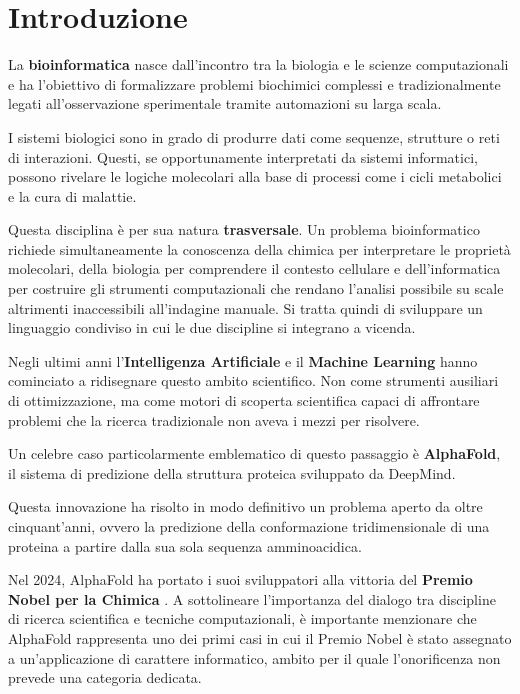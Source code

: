 \chapter{Introduzione}

La \textbf{bioinformatica} nasce dall'incontro tra la biologia e le scienze computazionali e ha l'obiettivo di formalizzare problemi biochimici complessi e tradizionalmente legati all'osservazione sperimentale tramite automazioni su larga scala.

I sistemi biologici sono in grado di produrre dati come sequenze, strutture o reti di interazioni.
Questi, se opportunamente interpretati da sistemi informatici, possono rivelare le logiche molecolari alla base di processi come i cicli metabolici e la cura di malattie.

Questa disciplina è per sua natura \textbf{trasversale}. 
Un problema bioinformatico richiede simultaneamente 
la conoscenza della chimica per interpretare le 
proprietà molecolari, della biologia per comprendere 
il contesto cellulare e dell'informatica per 
costruire gli strumenti computazionali che rendano l'analisi possibile su scale altrimenti inaccessibili 
all'indagine manuale. Si tratta quindi di sviluppare un linguaggio 
condiviso in cui le due discipline si integrano 
a vicenda.

Negli ultimi anni l'\textbf{Intelligenza Artificiale} e il 
\textbf{Machine Learning} hanno cominciato a ridisegnare
questo ambito scientifico. Non come strumenti ausiliari di 
ottimizzazione, ma come motori di scoperta scientifica 
capaci di affrontare problemi che la ricerca tradizionale 
non aveva i mezzi per risolvere.

Un celebre caso particolarmente emblematico
di questo passaggio è \textbf{AlphaFold}, il sistema di 
predizione della struttura proteica sviluppato da DeepMind.

Questa innovazione ha risolto in modo definitivo un problema aperto da oltre 
cinquant'anni, ovvero la predizione della conformazione 
tridimensionale di una proteina a partire dalla sua sola 
sequenza amminoacidica.

Nel 2024, AlphaFold ha portato i suoi sviluppatori 
alla vittoria del \textbf{Premio Nobel per la Chimica} 
\cite{jumperHighlyAccurateProtein2021}.
A sottolineare l'importanza del dialogo tra discipline di ricerca scientifica e tecniche computazionali, è importante menzionare che AlphaFold rappresenta uno dei primi casi in cui il Premio Nobel è stato assegnato a un'applicazione di carattere informatico, ambito per il quale l'onorificenza non prevede una categoria dedicata.

